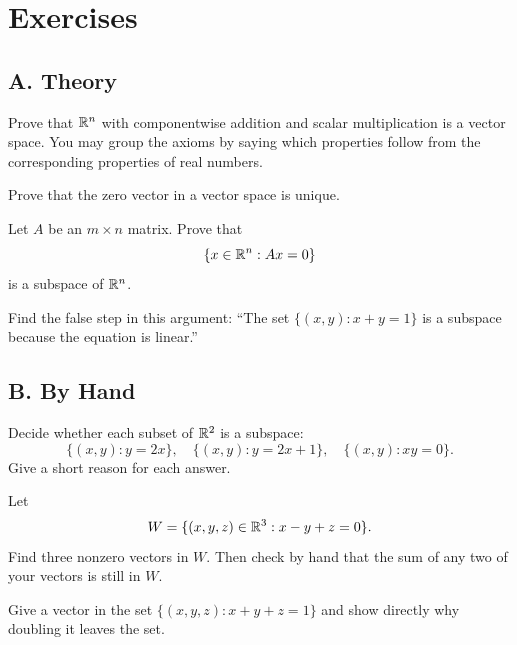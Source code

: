 \section*{Exercises}

\subsection*{A. Theory}

\begin{exercise}
Prove that $\mathbb{R}^n$ with componentwise addition and scalar multiplication is a
vector space. You may group the axioms by saying which properties follow from
the corresponding properties of real numbers.
\end{exercise}

\begin{exercise}
Prove that the zero vector in a vector space is unique.
\end{exercise}

\begin{exercise}
Let $A$ be an $m\times n$ matrix. Prove that
\[
  \{x\in\mathbb{R}^n:Ax=0\}
\]
is a subspace of $\mathbb{R}^n$.
\end{exercise}

\begin{exercise}
Find the false step in this argument: ``The set
$\{(x,y):x+y=1\}$ is a subspace because the equation is linear.''
\end{exercise}

\subsection*{B. By Hand}

\begin{exercise}
Decide whether each subset of $\mathbb{R}^2$ is a subspace:
\[
  \{(x,y):y=2x\},\quad
  \{(x,y):y=2x+1\},\quad
  \{(x,y):xy=0\}.
\]
Give a short reason for each answer.
\end{exercise}

\begin{exercise}
Let
\[
  W=\{(x,y,z)\in\mathbb{R}^3:x-y+z=0\}.
\]
Find three nonzero vectors in $W$. Then check by hand that the sum of any two
of your vectors is still in $W$.
\end{exercise}

\begin{exercise}
Give a vector in the set $\{(x,y,z):x+y+z=1\}$ and show directly why doubling
it leaves the set.
\end{exercise}

